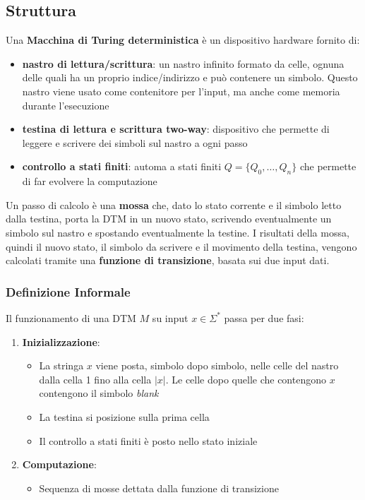 \subsection{Struttura}
Una \textbf{Macchina di Turing deterministica} è un dispositivo hardware fornito di: 
\begin{itemize}
	\item \textbf{nastro di lettura/scrittura}: un nastro infinito formato da celle, ognuna delle quali ha un proprio indice/indirizzo e può contenere un simbolo. Questo nastro viene usato come contenitore per l'input, ma anche come memoria durante l'esecuzione
	\item \textbf{testina di lettura e scrittura two-way}: dispositivo che permette di leggere e scrivere dei simboli sul nastro a ogni passo
	\item \textbf{controllo a stati finiti}: automa a stati finiti $Q = \{Q_0, \dots, Q_n\}$ che permette di far evolvere la computazione
\end{itemize}

Un passo di calcolo è una \textbf{mossa} che, dato lo stato corrente e il simbolo letto dalla testina, porta la DTM in un nuovo stato, scrivendo eventualmente un simbolo sul nastro e spostando eventualmente la testine. I risultati della mossa, quindi il nuovo stato, il simbolo da scrivere e il movimento della testina, vengono calcolati tramite una \textbf{funzione di transizione}, basata sui due input dati.

\subsubsection{Definizione Informale}

Il funzionamento di una DTM $M$ su input $x \in \Sigma^\ast$ passa per due fasi:
\begin{enumerate}
	\item \textbf{Inizializzazione}:
	\begin{itemize}
		\item La stringa $x$ viene posta, simbolo dopo simbolo, nelle celle del nastro dalla cella 1 fino alla cella $|x|$. Le celle dopo quelle che contengono $x$ contengono il simbolo \textit{blank}
		\item La testina si posizione sulla prima cella
		\item Il controllo a stati finiti è posto nello stato iniziale
	\end{itemize}
	\item \textbf{Computazione}:
	\begin{itemize}
		\item Sequenza di mosse dettata dalla funzione di transizione
	\end{itemize}
\end{enumerate}

